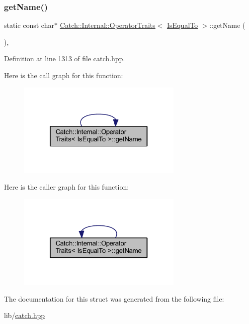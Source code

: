 \subsubsection{\texorpdfstring{get\+Name()}{getName()}}
{\footnotesize\ttfamily static const char$\ast$ \hyperlink{struct_catch_1_1_internal_1_1_operator_traits}{Catch\+::\+Internal\+::\+Operator\+Traits}$<$ \hyperlink{namespace_catch_1_1_internal_ae3f96598a7858155750bf38e7295d83ea30e0accba6ec8384f4383b04dd2a6a9e}{Is\+Equal\+To} $>$\+::get\+Name (\begin{DoxyParamCaption}{ }\end{DoxyParamCaption})\hspace{0.3cm}{\ttfamily [inline]}, {\ttfamily [static]}}



Definition at line 1313 of file catch.\+hpp.

Here is the call graph for this function\+:\nopagebreak
\begin{figure}[H]
\begin{center}
\leavevmode
\includegraphics[width=226pt]{struct_catch_1_1_internal_1_1_operator_traits_3_01_is_equal_to_01_4_addf03ac66f0ed83abcc037a7a327d4f1_cgraph}
\end{center}
\end{figure}
Here is the caller graph for this function\+:\nopagebreak
\begin{figure}[H]
\begin{center}
\leavevmode
\includegraphics[width=226pt]{struct_catch_1_1_internal_1_1_operator_traits_3_01_is_equal_to_01_4_addf03ac66f0ed83abcc037a7a327d4f1_icgraph}
\end{center}
\end{figure}


The documentation for this struct was generated from the following file\+:\begin{DoxyCompactItemize}
\item 
lib/\hyperlink{catch_8hpp}{catch.\+hpp}\end{DoxyCompactItemize}
